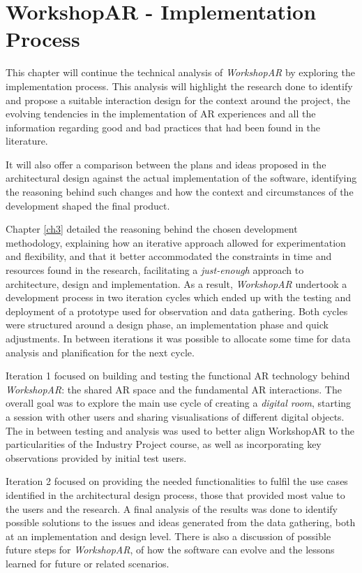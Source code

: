 \chapter{WorkshopAR - Implementation Process \label{ch5}}

This chapter will continue the technical analysis of \emph{WorkshopAR} by exploring the implementation process. This analysis will highlight the research done to identify and propose a suitable
interaction design for the context around the project, the evolving tendencies in the implementation of \acf{AR} experiences and all the information regarding good and bad practices
that had been found in the literature.

It will also offer a comparison between the plans and ideas proposed in the architectural design against the actual implementation of the software, identifying the reasoning behind such
changes and how the context and circumstances of the development shaped the final product.

Chapter \ref{ch3} detailed the reasoning behind the chosen development methodology, explaining how an iterative approach allowed for experimentation and flexibility, and that it better
accommodated the constraints in time and resources found in the research, facilitating a \emph{just-enough} approach to architecture, design and implementation. As a result, \emph{WorkshopAR}
undertook a development process in two iteration cycles which  ended up with the testing and deployment of a prototype used for observation and data gathering. Both cycles were structured
around a design phase, an implementation phase and quick adjustments. In between iterations it was possible to allocate some time for data analysis and planification for the next cycle.

Iteration 1 focused on building and testing the functional \ac{AR} technology behind \emph{WorkshopAR}: the shared \ac{AR} space and the fundamental \ac{AR} interactions. The overall goal
was to explore the main use cycle of creating a \emph{digital room}, starting a session with other users and sharing visualisations of different digital objects. The in between testing and
analysis was used to better align WorkshopAR to the particularities of the Industry Project course, as well as incorporating key observations provided by initial test users.

Iteration 2 focused on providing the needed functionalities to fulfil the use cases identified in the architectural design process, those that provided most value to the users and the
research. A final analysis of the results was done to identify possible solutions to the issues and ideas generated from the data gathering, both at an implementation and design level.
There is also a discussion of possible future steps for \emph{WorkshopAR}, of how the software can evolve and the lessons learned for future or related scenarios.

